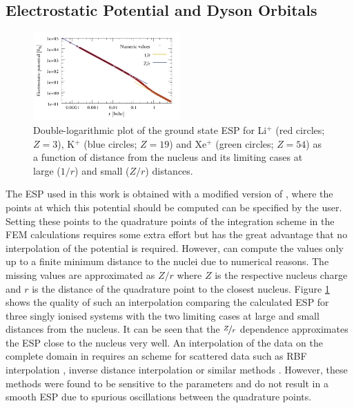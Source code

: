 \subsection{Electrostatic Potential and Dyson Orbitals}
\begin{figure}
\includegraphics[width=0.5\textwidth]{Figures/ESP}
\caption{Double-logarithmic plot of the ground state ESP for Li$^+$ (red circles; $Z=3$), K$^+$ (blue circles; $Z=19$) and Xe$^+$ (green circles; $Z=54$) as a function of distance from the nucleus and its limiting cases at large ($1/r$) and small ($Z/r$) distances.}
\label{fig:esp}
\end{figure}
The ESP used in this work is obtained with a modified version of  \cite{nwchem}, where the points at which this potential should be computed can be specified by the user.
Setting these points to the quadrature points of the integration scheme in the FEM calculations requires some extra effort but has the great advantage that no interpolation of the potential is required.
However,  can compute the values only up to a finite minimum distance to the nuclei due to numerical reasons.
The missing values are approximated as $Z/r$ where $Z$ is the respective nucleus charge and $r$ is the distance of the quadrature point to the closest nucleus.
Figure \ref{fig:esp} shows the quality of such an interpolation comparing the calculated ESP for three singly ionised systems with the two limiting cases at large and small distances from the nucleus.
It can be seen that the $\nicefrac{Z}{r}$ dependence approximates the ESP close to the nucleus very well.
An interpolation of the data on the complete domain in  \cite{FreeWilly} requires an scheme for scattered data such as RBF interpolation \cite{rbfSE,rbfInterpol,rbfSurf}, inverse distance interpolation \cite{adapt_idw,idw} or similar methods \cite{CompInterp,idw_krieging,interpol}.
However, these methods were found to be sensitive to the parameters and do not result in a smooth ESP due to spurious oscillations between the quadrature points.

